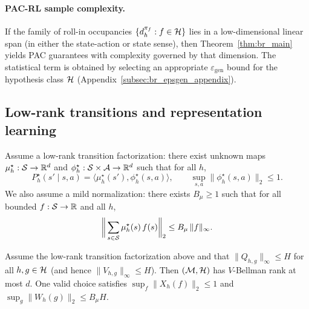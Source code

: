 \paragraph{PAC-RL sample complexity.}
If the family of roll-in occupancies $\{d_h^{\pi_f}: f\in\mathcal{H}\}$ lies in a low-dimensional linear
span (in either the state-action or state sense), then Theorem~\ref{thm:br_main} yields PAC guarantees
with complexity governed by that dimension.  The statistical term is obtained by selecting an
appropriate $\varepsilon_{\mathrm{gen}}$ bound for the hypothesis class $\mathcal{H}$
(Appendix~\ref{subsec:br_epsgen_appendix}).

\subsection{Low-rank transitions and representation learning}
\label{subsec:br_zoo_lowrank_rep}

Assume a low-rank transition factorization: there exist unknown maps
$\mu_h^\star:\mathcal{S}\to\mathbb{R}^d$ and $\phi_h^\star:\mathcal{S}\times\mathcal{A}\to\mathbb{R}^d$ such that for all $h$,
\[
P_h^\star(s'\mid s,a)=\langle \mu_h^\star(s'),\phi_h^\star(s,a)\rangle,
\qquad
\sup_{s,a}\|\phi_h^\star(s,a)\|_2\le 1.
\]
We also assume a mild normalization: there exists $B_\mu\ge 1$ such that for all bounded
$f:\mathcal{S}\to\mathbb{R}$ and all $h$,
\[
\bigg\|\sum_{s\in\mathcal{S}}\mu_h^\star(s)\,f(s)\bigg\|_2 \le B_\mu\,\|f\|_\infty.
\]

\begin{proposition}
\label{prop:br_lowrank_transitions}
Assume the low-rank transition factorization above and that $\|Q_{h,g}\|_\infty\le H$ for all $h,g\in\mathcal{H}$
(and hence $\|V_{h,g}\|_\infty\le H$).
Then $(\mathcal{M},\mathcal{H})$ has $V$-Bellman rank at most $d$.
One valid choice satisfies $\sup_f\|X_h(f)\|_2\le 1$ and $\sup_g\|W_h(g)\|_2\le B_\mu H$.
\end{proposition}

